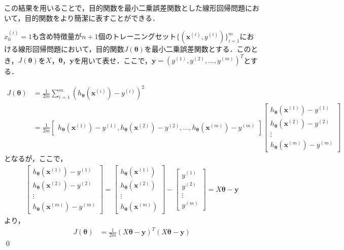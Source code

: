 この結果を用いることで，目的関数を最小二乗誤差関数とした線形回帰問題において，目的関数をより簡潔に表すことができる．

\begin{qu}
$x_0^{(i)}=1$も含め特徴量が$n+1$個のトレーニングセット$\{({\bm x}^{(i)},y^{(i)})\}_{i=1}^m$における線形回帰問題において，目的関数$J({\bm \theta})$を最小二乗誤差関数とする．このとき，$J({\bm \theta})$を$X$，${\bm \theta}$，${\bm y}$を用いて表せ．ここで，${\bm y}=(y^{(1)},y^{(2)},\ldots,y^{(m)})^T$とする．
\end{qu}
\begin{ans}
\begin{align}
J({\bm \theta})&= \frac{1}{2m}\sum_{i=1}^m (h_{{\bm \theta}}({\bm x}^{(i)})-y^{(i)})^2 \nonumber \\
&=\frac{1}{2m}
\begin{bmatrix}
h_{{\bm \theta}}({\bm x}^{(1)})-y^{(1)},h_{{\bm \theta}}({\bm x}^{(2)})-y^{(2)},\ldots,h_{{\bm \theta}}({\bm x}^{(m)})-y^{(m)}
\end{bmatrix}
\begin{bmatrix}
h_{{\bm \theta}}({\bm x}^{(1)})-y^{(1)} \\
h_{{\bm \theta}}({\bm x}^{(2)})-y^{(2)} \\
\vdots \\
h_{{\bm \theta}}({\bm x}^{(m)})-y^{(m)}
\end{bmatrix}\nonumber
\end{align}
となるが，ここで，
\begin{align}
\begin{bmatrix}
h_{{\bm \theta}}({\bm x}^{(1)})-y^{(1)} \\
h_{{\bm \theta}}({\bm x}^{(2)})-y^{(2)} \\
\vdots \\
h_{{\bm \theta}}({\bm x}^{(m)})-y^{(m)}
\end{bmatrix}
=
\begin{bmatrix}
h_{{\bm \theta}}({\bm x}^{(1)}) \\
h_{{\bm \theta}}({\bm x}^{(2)}) \\
\vdots \\
h_{{\bm \theta}}({\bm x}^{(m)})
\end{bmatrix}
-
\begin{bmatrix}
y^{(1)} \\
y^{(2)} \\
\vdots \\
y^{(m)}
\end{bmatrix}
=X{\bm \theta}-{\bm y} \nonumber
\end{align}
より，
\begin{align}
J({\bm \theta})&= \frac{1}{2m}(X{\bm \theta}-{\bm y})^T(X{\bm \theta}-{\bm y})
\end{align}\qed
\end{ans}

